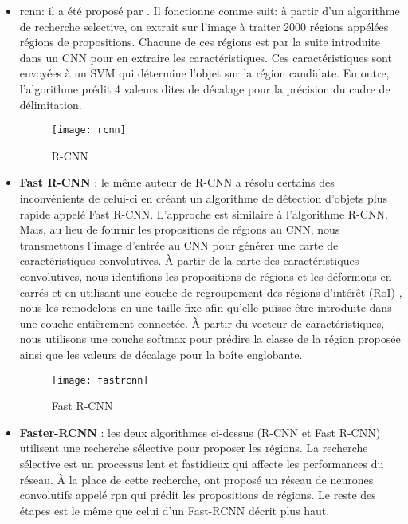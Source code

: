         \begin{itemize}
            \item \acrfull{rcnn}: il a été proposé par \textbf{\citeauthor{rcnn}}. Il fonctionne comme suit: à partir d’un algorithme de recherche selective, on extrait sur l’image à traiter 2000 régions appélées régions de propositions. Chacune de ces régions est par la suite introduite dans un CNN pour en extraire les caractéristiques. Ces caractéristiques sont envoyées à un SVM qui détermine l'objet sur la région candidate. En outre, l’algorithme prédit 4 valeurs dites de décalage pour la précision du cadre de délimitation.
                \begin{figure}[H]
                    \centering
                    \texttt{[image: rcnn]}
                    \caption{R-CNN}
                \end{figure}
            \item \textbf{Fast R-CNN} : le même auteur de R-CNN a résolu certains des inconvénients de celui-ci en créant un algorithme de détection d'objets plus rapide appelé Fast R-CNN. L'approche est similaire à l'algorithme R-CNN. Mais, au lieu de fournir les propositions de régions au CNN, nous transmettons l'image d'entrée au CNN pour générer une carte de caractéristiques convolutives. À partir de la carte des caractéristiques convolutives, nous identifions les propositions de régions et les déformons en carrés et en utilisant une couche de regroupement des régions d'intérêt (RoI) , nous les remodelons en une taille fixe afin qu'elle puisse être introduite dans une couche entièrement connectée. À partir du vecteur de caractéristiques, nous utilisons une couche softmax pour prédire la classe de la région proposée ainsi que les valeurs de décalage pour la boîte englobante.
                \begin{figure}[H]
                    \centering
                    \texttt{[image: fastrcnn]}
                    \caption{Fast R-CNN}
                \end{figure}
            \item \textbf{Faster-RCNN} : les deux algorithmes ci-dessus (R-CNN et Fast R-CNN) utilisent une recherche sélective pour proposer les régions. La recherche sélective est un processus lent et fastidieux qui affecte les performances du réseau. À la place de cette recherche, \textbf{\citeauthor{rcnnfaster}} ont proposé un réseau de neurones convolutifs appelé \acrfull{rpn} qui prédit les propositions de régions. Le reste des étapes est le même que celui d'un Fast-RCNN décrit plus haut.

\end{itemize}
